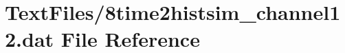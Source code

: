 \hypertarget{8time2histsim__channel12_8dat}{}\section{Text\+Files/8time2histsim\+\_\+channel12.dat File Reference}
\label{8time2histsim__channel12_8dat}
